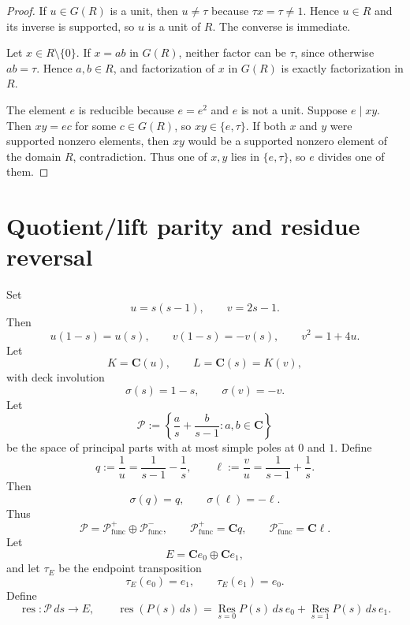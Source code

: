 \documentclass[11pt]{article}
\newcommand{\C}{\mathbf C}
\newcommand{\Res}{\operatorname*{Res}}
\newcommand{\res}{\operatorname{res}}
\newcommand{\ellp}{\ell}
\newcommand{\1}{\mathbf 1}
\newcommand{\func}{\mathrm{func}}
\numberwithin{equation}{section}
\begin{document}
\begin{proof}
If $u\in G(R)$ is a unit, then $u\ne\tau$ because $\tau x=\tau\ne1$.  Hence $u\in R$ and its inverse is supported, so $u$ is a unit of $R$.  The converse is immediate.

Let $x\in R\setminus\{0\}$.  If $x=ab$ in $G(R)$, neither factor can be $\tau$, since otherwise $ab=\tau$.  Hence $a,b\in R$, and factorization of $x$ in $G(R)$ is exactly factorization in $R$.

The element $e$ is reducible because $e=e^2$ and $e$ is not a unit.  Suppose $e\mid xy$.  Then $xy=ec$ for some $c\in G(R)$, so $xy\in\{e,\tau\}$.  If both $x$ and $y$ were supported nonzero elements, then $xy$ would be a supported nonzero element of the domain $R$, contradiction.  Thus one of $x,y$ lies in $\{e,\tau\}$, so $e$ divides one of them.
\end{proof}

\section{Quotient/lift parity and residue reversal}\label{sec:residue}

Set
\begin{equation}
  u=s(s-1),\qquad v=2s-1.
\end{equation}
Then
\begin{equation}
  u(1-s)=u(s),\qquad v(1-s)=-v(s),\qquad v^2=1+4u.
\end{equation}
Let
\begin{equation}
  K=\C(u),\qquad L=\C(s)=K(v),
\end{equation}
with deck involution
\begin{equation}
  \sigma(s)=1-s,
  \qquad
  \sigma(v)=-v.
\end{equation}
Let
\begin{equation}
  \mathcal P:=\left\{\frac as+\frac b{s-1}:a,b\in\C\right\}
\end{equation}
be the space of principal parts with at most simple poles at $0$ and $1$.  Define
\begin{equation}
  q:=\frac1u=\frac1{s-1}-\frac1s,
  \qquad
  \ellp:=\frac vu=\frac1{s-1}+\frac1s.
\end{equation}
Then
\begin{equation}
  \sigma(q)=q,
  \qquad
  \sigma(\ellp)=-\ellp.
\end{equation}
Thus
\begin{equation}
  \mathcal P=\mathcal P^+_{\func}\oplus\mathcal P^-_{\func},
  \qquad
  \mathcal P^+_{\func}=\C q,
  \qquad
  \mathcal P^-_{\func}=\C\ellp.
\end{equation}
Let
\begin{equation}
  E=\C e_0\oplus\C e_1,
\end{equation}
and let $\tau_E$ be the endpoint transposition
\begin{equation}
  \tau_E(e_0)=e_1,
  \qquad
  \tau_E(e_1)=e_0.
\end{equation}
Define
\begin{equation}
  \res:\mathcal P\,ds\to E,
  \qquad
  \res(P(s)\,ds)=\Res_{s=0}P(s)\,ds\,e_0+
  \Res_{s=1}P(s)\,ds\,e_1.
\end{equation}
\end{document}
